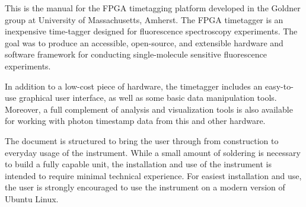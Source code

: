 This is the manual for the FPGA timetagging platform developed in the
Goldner group at University of Massachusetts, Amherst. The FPGA
timetagger is an inexpensive time-tagger designed for
fluorescence spectroscopy experiments. The goal was to produce an
accessible, open-source, and extensible hardware and software
framework for conducting single-molecule sensitive fluorescence
experiments.

In addition to a low-cost piece of hardware, the timetagger includes
an easy-to-use graphical user interface, as well as some basic data
manipulation tools. Moreover, a full complement of analysis and
visualization tools is also available for working with photon
timestamp data from this and other hardware.

The document is structured to bring the user through from
construction to everyday usage of the instrument. While a small amount
of soldering is necessary to build a fully capable unit, the
installation and use of the instrument is intended to require minimal
technical experience. For easiest installation and use, the user is
strongly encouraged to use the instrument on a modern version of
Ubuntu Linux.

